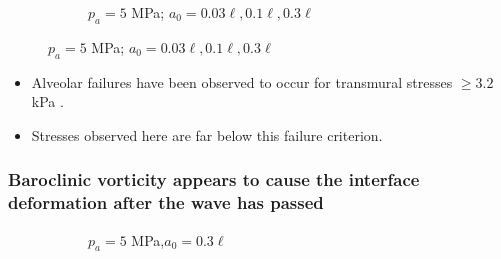 \begin{frame}
{\begin{figure}
\begin{subfigure}{0.48\textwidth}
        \caption{$p_a = 5$ MPa; $a_0 = 0.03\ell, 0.1\ell, 0.3\ell$}
      \end{subfigure}
    \end{figure}
    \begin{itemize}
    \item Alveolar failures have been observed to occur for transmural
      stresses $\geq 3.2$ kPa \citep{West1991}.
    \item Stresses observed here are far below this failure criterion.
    \end{itemize}
  }
\end{frame}
% 
% 
\begin{frame}
  \frametitle{Baroclinic vorticity appears to cause the interface deformation after the wave has passed}
  \begin{figure}
    \centering
    \begin{subfigure}[b]{0.6\textwidth}
      \caption{\label{fig:vorticity_snapshot_A50_a30} $p_a = 5$ MPa,$a_0 = 0.3\ell$\\ \qquad}
    \end{subfigure}
    \begin{subfigure}[b]{0.35\textwidth}
\end{subfigure}
\end{figure}
\end{frame}
